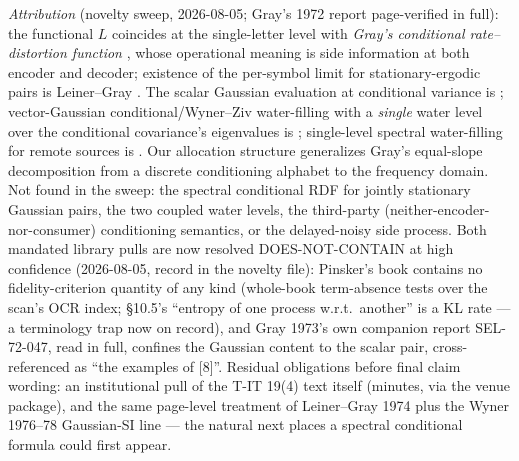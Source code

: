 ﻿\documentclass[11pt]{article}
\theoremstyle{remark}
\begin{document}
\emph{Attribution} (novelty sweep, 2026-08-05; Gray's 1972 report
page-verified in full): the functional $L$ coincides at the
single-letter level with \emph{Gray's conditional rate--distortion
function} \cite{gray72,gray73}, whose operational meaning is side
information at both encoder and decoder; existence of the per-symbol
limit for stationary-ergodic pairs is Leiner--Gray \cite{leinergray}.
The scalar Gaussian evaluation at conditional variance is
\cite[Thm.~7]{gray72}; vector-Gaussian conditional/Wyner--Ziv
water-filling with a \emph{single} water level over the conditional
covariance's eigenvalues is \cite{gkagkos,stylianou}; single-level
spectral water-filling for remote sources is \cite{kipnis}. Our
allocation structure generalizes Gray's equal-slope decomposition
\cite[Thm.~5]{gray72} from a discrete conditioning alphabet to the
frequency domain. Not found in the sweep: the spectral conditional RDF
for jointly stationary Gaussian pairs, the two coupled water levels,
the third-party (neither-encoder-nor-consumer) conditioning semantics,
or the delayed-noisy side process. Both mandated library pulls are now
resolved DOES-NOT-CONTAIN at high confidence (2026-08-05, record in
the novelty file): Pinsker's book contains no fidelity-criterion
quantity of any kind (whole-book term-absence tests over the scan's
OCR index; \S10.5's ``entropy of one process w.r.t.\ another'' is a
KL rate --- a terminology trap now on record), and Gray 1973's own
companion report SEL-72-047, read in full, confines the Gaussian
content to the scalar pair, cross-referenced as ``the examples of
[8]''. Residual obligations before final claim wording: an
institutional pull of the T-IT 19(4) text itself (minutes, via the
venue package), and the same page-level treatment of Leiner--Gray
1974 \cite{leinergray} plus the Wyner 1976--78 Gaussian-SI line ---
the natural next places a spectral conditional formula could first
appear.
\end{document}
